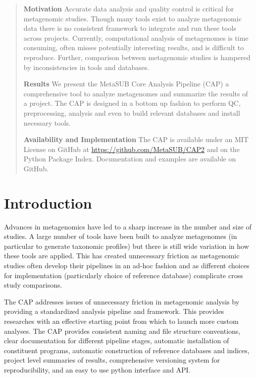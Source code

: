 \begin{abstract}

\textbf{Motivation}  Accurate data analysis and quality control is critical for metagenomic studies. Though many tools exist to analyze metagenomic data there is no consistent framework to integrate and run these tools across projects. Currently, computational analysis of metagenomes is time consuming, often misses potentially interesting results, and is difficult to reproduce. Further, comparison between metagenomic studies is hampered by inconsistencies in tools and databases.

\textbf{Results} We present the MetaSUB Core Analysis Pipeline (CAP) a comprehensive tool to analyze metagenomes and summarize the results of a project. The CAP is designed in a bottom up fashion to perform QC, preprocessing, analysis and even to build relevant databases and install necessary tools.

\textbf{Availability and Implementation} The CAP is available under an MIT License on GitHub at \url{https://github.com/MetaSUB/CAP2} and on the Python Package Index. Documentation and examples are available on GitHub.

\end{abstract}

\section{Introduction}

Advances in metagenomics have led to a sharp increase in the number and size of studies. A large number of tools have been built to analyze metagenomes (in particular to generate taxonomic profiles) but there is still wide variation in how these tools are applied. This has created unnecessary friction as metagenomic studies often develop their pipelines in an ad-hoc fashion and as different choices for implementation (particularly choice of reference database) complicate cross study comparisons.

The CAP addresses issues of unnecessary friction in metagenomic analysis by providing a standardized analysis pipeline and framework. This provides researches with an effective starting point from which to launch more custom analyses. The CAP provides consistent naming and file structure conventions, clear documentation for different pipeline stages, automatic installation of constituent programs, automatic construction of reference databases and indices, project level summaries of results, comprehensive versioning system for reproducibility, and an easy to use python interface and API.

